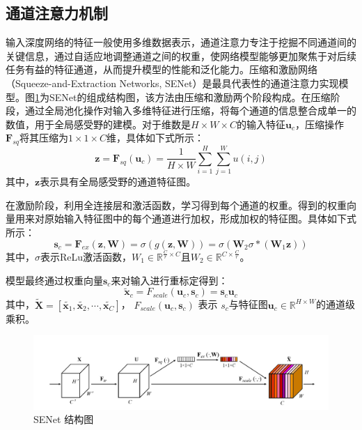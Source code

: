 \subsection{通道注意力机制}
输入深度网络的特征一般使用多维数据表示，通道注意力专注于挖掘不同通道间的关键信息，通过自适应地调整通道之间的权重，使网络模型能够更加聚焦于对后续任务有益的特征通道，从而提升模型的性能和泛化能力。压缩和激励网络（Squeeze-and-Extraction Networks, SENet）是最具代表性的通道注意力实现模型。图\ref{SENet}为SENet的组成结构图，该方法由压缩和激励两个阶段构成。在压缩阶段，通过全局池化操作对输入多维特征进行压缩，将每个通道的信息整合成单一的数值，用于全局感受野的建模。对于维数是$H\times W \times C$的输入特征$\mathbf{u}_c$，压缩操作$\mathbf{F}_{sq}$将其压缩为$1 \times 1 \times C$维，具体如下式所示：
\begin{equation}
    \mathbf{z}=\mathbf{F}_{sq}\left( \mathbf{u}_c \right) =\frac{1}{H\times W}\sum_{i=1}^H{\sum_{j=1}^W{u\left( i,j \right)}}
\end{equation}
其中，$\mathbf{z}$表示具有全局感受野的通道特征图。

在激励阶段，利用全连接层和激活函数，学习得到每个通道的权重。得到的权重向量用来对原始输入特征图中的每个通道进行加权，形成加权的特征图。具体如下式所示：
\begin{equation}
    \mathbf{s}_c=\mathbf{F}_{ex}\left( \mathbf{z},\mathbf{W} \right) =\sigma \left( g\left( \mathbf{z},\mathbf{W} \right) \right) =\sigma \left( \mathbf{W}_2\sigma *\left( \mathbf{W}_1\mathbf{z} \right) \right)
\end{equation}
其中，$\sigma$表示ReLu激活函数，$W_1 \in \mathbb{R}^{\frac{C}{r}\times C}$且$W_2 \in \mathbb{R}^{C \times \frac{C}{r}}$。

模型最终通过权重向量$\mathbf{s}_c$来对输入进行重标定得到：
\begin{equation}
    \widetilde{\mathbf{x}}_c=F_{scale}\left( \mathbf{u}_c,\mathbf{s}_c \right) =\mathbf{s}_c \mathbf{u}_c
\end{equation}
其中，$ \widetilde{\mathbf{X}}=\left[ \widetilde{\mathbf{x}_1},\widetilde{\mathbf{x}_2},\cdots ,\widetilde{\mathbf{x}_C} \right] $， $F_{scale}\left( \mathbf{u}_c,\mathbf{s}_c \right)$ 表示 $s_c$与特征图$\mathbf{u}_c \in \mathbb{R}^{H\times W}$的通道级乘积。


\begin{figure}[h]
    \centering
    \includegraphics[width=14cm]{pic/chapter3/SENet.jpg}
    \caption{SENet 结构图}
    \label{SENet}
\end{figure}

